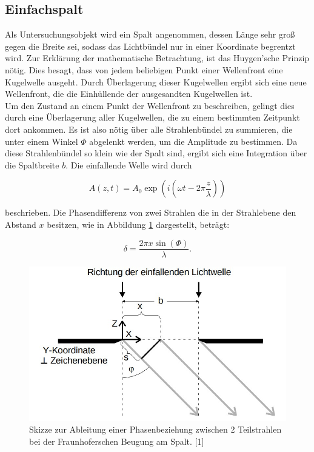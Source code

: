 \subsection{Einfachspalt}

Als Untersuchungsobjekt wird ein Spalt angenommen, dessen Länge sehr groß gegen die Breite sei, sodass 
das Lichtbündel nur in einer Koordinate begrentzt wird. Zur Erklärung der mathematische Betrachtung, ist 
das Huygen'sche Prinzip nötig. Dies besagt, dass 
von jedem beliebigen Punkt einer Wellenfront eine Kugelwelle ausgeht. Durch Überlagerung dieser Kugelwellen
ergibt sich eine neue Wellenfront, die die Einhüllende der ausgesandten Kugelwellen ist. \\
Um den Zustand 
an einem Punkt der Wellenfront zu beschreiben, gelingt dies durch eine Überlagerung aller Kugelwellen, die
zu einem bestimmten Zeitpunkt dort ankommen. Es ist also nötig über alle Strahlenbündel zu summieren, die 
unter einem Winkel $\Phi$ abgelenkt werden, um die Amplitude zu bestimmen. Da diese Strahlenbündel so klein wie 
der Spalt sind, ergibt sich eine Integration über die Spaltbreite $b$. 
Die einfallende Welle wird durch 

\begin{equation*}
A(z,t) = A_0\exp{\left(i(\omega t - 2\pi\frac{z}{\lambda})\right)}
\end{equation*}

beschrieben. Die Phasendifferenz von zwei Strahlen die in der Strahlebene den Abstand $x$ besitzen, wie 
in Abbildung \ref{fig:Phase} dargestellt, beträgt:

\begin{equation*}
\delta = \frac{2\pi x\sin{(\Phi)}}{\lambda}. 
\end{equation*}

\begin{figure}
  \centering
  \includegraphics[scale=0.3]{content/Phase.jpg}
  \caption{Skizze zur Ableitung einer Phasenbeziehung zwischen 2 Teilstrahlen bei der Fraunhoferschen
Beugung am Spalt. [1]}
  \label{fig:Phase}
\end{figure}

